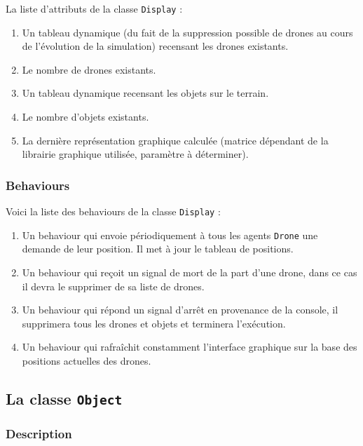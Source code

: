 \documentclass[11pt]{report}
\begin{document}
La liste d'attributs de la classe \verb|Display| :

\begin{enumerate}
\item Un tableau dynamique (du fait de la suppression possible de drones au cours de l'évolution de la simulation) recensant les drones existants.

\item Le nombre de drones existants.

\item Un tableau dynamique recensant les objets sur le terrain.

\item Le nombre d'objets existants.

\item La dernière représentation graphique calculée (matrice dépendant de la librairie graphique utilisée, paramètre à déterminer).
\end{enumerate}

\subsubsection{Behaviours}

Voici la liste des behaviours de la classe \verb|Display| :

\begin{enumerate}
\item Un behaviour qui envoie périodiquement à tous les agents \verb|Drone| une demande de leur position. Il met à jour le tableau de positions.

\item Un behaviour qui reçoit un signal de mort de la part d'une drone, dans ce cas il devra le supprimer de sa liste de drones.

\item Un behaviour qui répond un signal d'arrêt en provenance de la console, il supprimera tous les drones et objets et terminera l'exécution.

\item Un behaviour qui rafraîchit constamment l'interface graphique sur la base des positions actuelles des drones.
\end{enumerate}

\newpage
\subsection{La classe \protect\Verb+Object+}
\subsubsection{Description}
\end{document}
